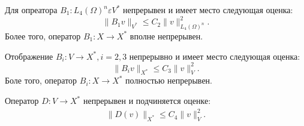 \begin{lemma}\label{lm:3.3}
    Для опреатора $B_1:L_4(\Omega)^n\varepsilon V^*$ непрерывен и имеет место следующая оценка:
    $$\parallel B_1v\parallel_{V^*}\leqslant C_2\parallel v\parallel^2_{L_4(\Omega)^n}.$$
    Более того, оператор $B_1:X\rightarrow X^*$ вполне непрерывен.
\end{lemma}

\begin{lemma}\label{lm:3.4}
    Отображение $B_i:V\rightarrow X^*, i=2,3$ непрерывно и имеет место следующая оценка:
    $$\parallel B_iv\parallel_{X^*}\leqslant C_3\parallel v\parallel^2_V.$$
    Боле того, оператор $B_i:X\rightarrow X^*$ полностью непрерывен.
\end{lemma}

\begin{lemma}\label{lm:3.5}
    Оператор $D:V\rightarrow X^*$ непрерывен и подчиняется оценке:
    \begin{equation}\label{eq:3.4}
        \begin{gathered}
            \parallel D(v)\parallel_{X^*} \leqslant C_4\parallel v\parallel^2_V.
        \end{gathered}
    \end{equation}
\end{lemma}

